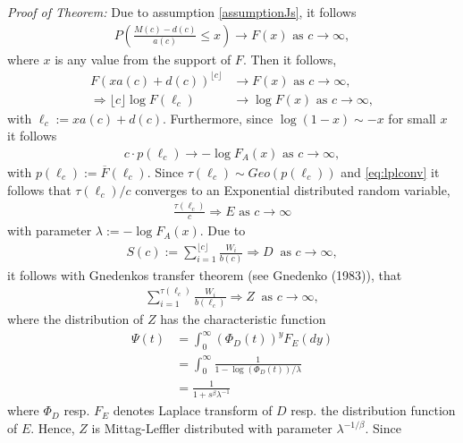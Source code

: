 \documentclass[]{elsarticle} %
\begin{document}
\emph{Proof of Theorem:} Due to assumption \eqref{assumptionJs}, it
follows \begin{align*}
    P\left(\frac{M(c)-d(c)}{a(c)} \leq x\right) \rightarrow F(x) \text{ as } c \rightarrow \infty,
    \end{align*} where \(x\) is any value from the support of \(F\).
Then it follows, \begin{align*}
      F(xa(c)+d(c))^{\lfloor c \rfloor} &\rightarrow F(x) \text{ as } c \rightarrow \infty,\\
      \Rightarrow  \lfloor c \rfloor \log F(\ell_c)  &\rightarrow \log F(x)\text{ as } c \rightarrow \infty,
    \end{align*} with \(\ell_c:=xa(c)+d(c)\). Furthermore, since
\(\log(1-x) \sim -x\) for small \(x\) it follows \begin{align}
      c \cdot p(\ell_c) \rightarrow -\log F_A(x)  \text{ as } c \rightarrow \infty,\label{eq:lplconv}
    \end{align} with \(p(\ell_c):= \overline{F}(\ell_c)\). Since
\(\tau(\ell_c) \sim Geo(p(\ell_c))\) and \eqref{eq:lplconv} it follows
that \(\tau(\ell_c)/c\) converges to an Exponential distributed random
variable, \begin{align*}
    \frac{\tau(\ell_c)}{c} \Rightarrow E  \text{ as } c \rightarrow \infty
    \end{align*} with parameter \(\lambda:=-\log F_A(x)\). Due to
\begin{align*}
    S(c):= \sum_{i=1}^{\lfloor c \rfloor} \frac{W_i}{b(c)} \Rightarrow D \ \text{ as } c \rightarrow \infty,
    \end{align*} it follows with Gnedenkos transfer theorem (see
Gnedenko (1983)), that \begin{align}
    \sum_{i=1}^{ \tau(\ell_c)} \frac{W_i}{b(\ell_c)}  \Rightarrow Z\ \text{ as }  c \rightarrow \infty, \label{TheoGutArg}
    \end{align} where the distribution of \(Z\) has the characteristic
function \begin{align}
    \Psi(t) &= \int_0^{\infty} (\Phi_D(t))^{y} F_E(dy) \nonumber\\
    &= \int_0^{\infty} \frac{1}{1-\log(\Phi_D(t))/\lambda} \nonumber\\
    &= \frac{1}{1+s^{\beta}\lambda^{-1}}
    \end{align} where \(\Phi_D\) resp. \(F_E\) denotes Laplace transform
of \(D\) resp. the distribution function of \(E\). Hence, \(Z\) is
Mittag-Leffler distributed with parameter \(\lambda^{-1/\beta}\). Since
\end{document}
